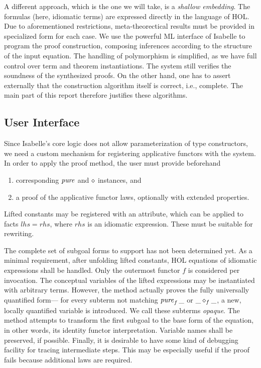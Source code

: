 A different approach, which is the one we will take, is a \emph{shallow embedding}.
The formulas (here, idiomatic terms) are expressed directly in the language of HOL.
Due to aforementioned restrictions, meta-theorectical results must be provided
in specialized form for each case.
We use the powerful ML interface of Isabelle to program the proof construction,
composing inferences according to the structure of the input equation.
The handling of polymorphism is simplified, as we have full control over
term and theorem instantiations.
The system still verifies the soundness of the synthesized proofs.
On the other hand, one has to assert externally that the construction algorithm
itself is correct, i.e., complete.
The main part of this report therefore justifies these algorithms.



\subsection{User Interface}\label{subsec:interface}

Since Isabelle's core logic does not allow parameterization of type constructors,
we need a custom mechanism for registering applicative functors with the
system.
In order to apply the proof method, the user must provide beforehand
\begin{enumerate}
	\item corresponding $\operatorname{\mathit{pure}}$ and $\diamond$ instances, and
	\item a proof of the applicative functor laws, optionally with extended
	properties.
\end{enumerate}
Lifted constants may be registered with an attribute, which can be applied to
facts $\mathit{lhs} = \mathit{rhs}$, where $\mathit{rhs}$ is an idiomatic
expression.
These must be suitable for rewriting.

The complete set of subgoal forms to support has not been determined yet.
\todo{}
As a minimal requirement, after unfolding lifted constants, HOL equations of
idiomatic expressions shall be handled.
Only the outermost functor $f$ is considered per invocation.
The conceptual variables of the lifted expressions may be instantiated with
arbitrary terms.
However, the method actually proves the fully universally quantified form---%
for every subterm not matching $\operatorname{\mathit{pure}}_f{\_}$ or $\_ \diamond_f \_$, a new, locally
quantified variable is introduced.
We call these subterms \emph{opaque}.
The method attempts to transform the first subgoal to the base form of the
equation, in other words, its identity functor interpretation.
Variable names shall be preserved, if possible.
Finally, it is desirable to have some kind of debugging facility for tracing
intermediate steps.
This may be especially useful if the proof fails because additional laws are
required.

